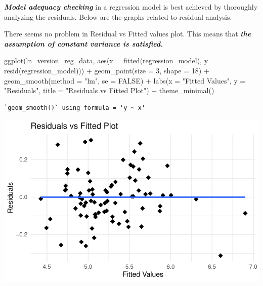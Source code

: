 \documentclass[
  11pt,
  a4paper,
  DIV=11,
  numbers=noendperiod]{scrartcl}
\newenvironment{Shaded}{\begin{snugshade}}{\end{snugshade}}
\newcommand{\AttributeTok}[1]{\textcolor[rgb]{0.40,0.45,0.13}{#1}}
\newcommand{\ConstantTok}[1]{\textcolor[rgb]{0.56,0.35,0.01}{#1}}
\newcommand{\DecValTok}[1]{\textcolor[rgb]{0.68,0.00,0.00}{#1}}
\newcommand{\FunctionTok}[1]{\textcolor[rgb]{0.28,0.35,0.67}{#1}}
\newcommand{\NormalTok}[1]{\textcolor[rgb]{0.00,0.23,0.31}{#1}}
\newcommand{\SpecialCharTok}[1]{\textcolor[rgb]{0.37,0.37,0.37}{#1}}
\newcommand{\StringTok}[1]{\textcolor[rgb]{0.13,0.47,0.30}{#1}}
\begin{document}
{\textbf{\emph{Model adequacy checking}}} in a regression model is best
achieved by thoroughly analyzing the residuals. Below are the graphs
related to {residual analysis.}

There seems no problem in Residual vs Fitted values plot. This means
that \textbf{\emph{the assumption of constant variance is satisfied.}}

\begin{Shaded}
\begin{Highlighting}[]
\FunctionTok{ggplot}\NormalTok{(ln\_version\_reg\_data, }\FunctionTok{aes}\NormalTok{(}\AttributeTok{x =} \FunctionTok{fitted}\NormalTok{(regression\_model), }\AttributeTok{y =} \FunctionTok{resid}\NormalTok{(regression\_model))) }\SpecialCharTok{+}
  \FunctionTok{geom\_point}\NormalTok{(}\AttributeTok{size =} \DecValTok{3}\NormalTok{, }\AttributeTok{shape =} \DecValTok{18}\NormalTok{) }\SpecialCharTok{+}
  \FunctionTok{geom\_smooth}\NormalTok{(}\AttributeTok{method =} \StringTok{"lm"}\NormalTok{, }\AttributeTok{se =} \ConstantTok{FALSE}\NormalTok{) }\SpecialCharTok{+}
  \FunctionTok{labs}\NormalTok{(}\AttributeTok{x =} \StringTok{"Fitted Values"}\NormalTok{, }\AttributeTok{y =} \StringTok{"Residuals"}\NormalTok{, }\AttributeTok{title =} \StringTok{"Residuals vs Fitted Plot"}\NormalTok{) }\SpecialCharTok{+}
  \FunctionTok{theme\_minimal}\NormalTok{()}
\end{Highlighting}
\end{Shaded}

\begin{verbatim}
`geom_smooth()` using formula = 'y ~ x'
\end{verbatim}

\includegraphics{project_files/figure-pdf/unnamed-chunk-41-1.pdf}
\end{document}
